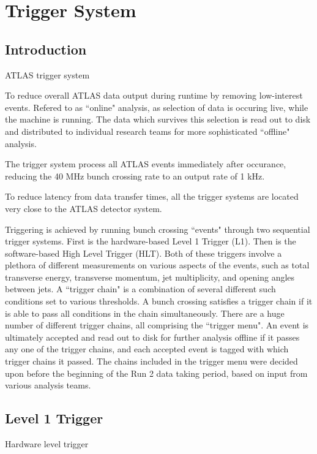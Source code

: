 \chapter{Trigger System} %
\section{Introduction}
ATLAS trigger system

To reduce overall ATLAS data output during runtime by removing low-interest events.
Refered to as ``online" analysis, as selection of data is occuring live, while the machine is running.
The data which survives this selection is read out to disk and distributed to individual research teams for more sophisticated ``offline" analysis.

The trigger system process all ATLAS events immediately after occurance, reducing the 40 MHz bunch crossing rate to an output rate of 1 kHz.

To reduce latency from data transfer times, all the trigger systems are located very close to the ATLAS detector system.

Triggering is achieved by running bunch crossing ``events" through two sequential trigger systems.
First is the hardware-based Level 1 Trigger (L1).
Then is the software-based High Level Trigger (HLT).
Both of these triggers involve a plethora of different measurements on various aspects of the events, such as total transverse energy, transverse momentum, jet multiplicity, and opening angles between jets.
A ``trigger chain" is a combination of several different such conditions set to various thresholds.
A bunch crossing satisfies a trigger chain if it is able to pass all conditions in the chain simultaneously.
There are a huge number of different trigger chains, all comprising the ``trigger menu".
An event is ultimately accepted and read out to disk for further analysis offline if it passes any one of the trigger chains, and each accepted event is tagged with which trigger chains it passed.
The chains included in the trigger menu were decided upon before the beginning of the Run 2 data taking period, based on input from various analysis teams.



\section{Level 1 Trigger}

Hardware level trigger

